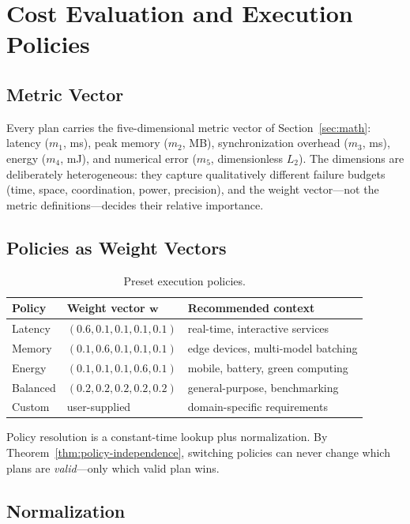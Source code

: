 \section{Cost Evaluation and Execution Policies}
\label{sec:cost}

\subsection{Metric Vector}

Every plan carries the five-dimensional metric vector of
Section~\ref{sec:math}: latency ($m_1$, ms), peak memory ($m_2$, MB),
synchronization overhead ($m_3$, ms), energy ($m_4$, mJ), and
numerical error ($m_5$, dimensionless $L_2$). The dimensions are
deliberately heterogeneous: they capture qualitatively different
failure budgets (time, space, coordination, power, precision), and the
weight vector---not the metric definitions---decides their relative
importance.

\subsection{Policies as Weight Vectors}

\begin{table}[H]
\centering
\small
\caption{Preset execution policies.}
\label{tab:policies}
\begin{tabular}{@{}lll@{}}
\toprule
Policy & Weight vector $\mathbf{w}$ & Recommended context \\
\midrule
Latency  & $(0.6, 0.1, 0.1, 0.1, 0.1)$ & real-time, interactive services \\
Memory   & $(0.1, 0.6, 0.1, 0.1, 0.1)$ & edge devices, multi-model batching \\
Energy   & $(0.1, 0.1, 0.1, 0.6, 0.1)$ & mobile, battery, green computing \\
Balanced & $(0.2, 0.2, 0.2, 0.2, 0.2)$ & general-purpose, benchmarking \\
Custom   & user-supplied               & domain-specific requirements \\
\bottomrule
\end{tabular}
\end{table}

Policy resolution is a constant-time lookup plus normalization. By
Theorem~\ref{thm:policy-independence}, switching policies can never
change which plans are \emph{valid}---only which valid plan wins.

\subsection{Normalization}

